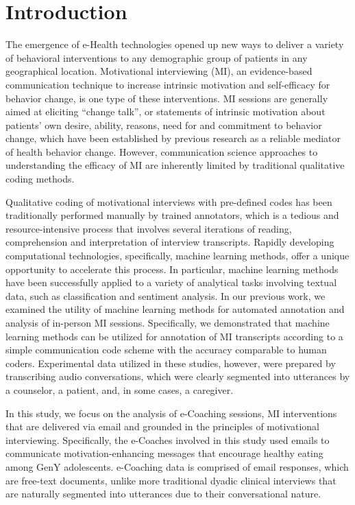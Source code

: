 \documentclass{amia}
\begin{document}
\section*{Introduction}
The emergence of e-Health technologies opened up new ways to deliver a variety of behavioral interventions to any demographic group of patients in any geographical location. Motivational interviewing (MI), an evidence-based communication technique to increase intrinsic motivation and self-efficacy for behavior change\cite{miller2012motivational,miller2009ten,miller2009toward}, is one type of these interventions. MI sessions are generally aimed at eliciting ``change talk'', or statements of intrinsic motivation about patients' own desire, ability, reasons, need for and commitment to behavior change, which have been established by previous research\cite{apodaca2009mechanisms} as a reliable mediator of health behavior change. However, communication science approaches to understanding the efficacy of MI are inherently limited by traditional qualitative coding methods. 

Qualitative coding of motivational interviews with pre-defined codes has been traditionally performed manually by trained annotators, which is a tedious and resource-intensive process that involves several iterations of reading, comprehension and interpretation of interview transcripts. Rapidly developing computational technologies, specifically, machine learning methods, offer a unique opportunity to accelerate this process. In particular, machine learning methods have been successfully applied to a variety of analytical tasks involving textual data, such as classification\cite{nigam2000text} and sentiment analysis\cite{wang2012baselines}. In our previous work, we examined the utility of machine learning methods for automated annotation \cite{hasan2016study,kotov2015interpretable} and analysis \cite{hasan2018predicting} of in-person MI sessions. Specifically, we demonstrated that machine learning methods can be utilized for annotation of MI transcripts according to a simple communication code scheme with the accuracy comparable to human coders\cite{hasan2016study}. Experimental data utilized in these studies, however, were prepared by transcribing audio conversations, which were clearly segmented into utterances by a counselor, a patient, and, in some cases, a caregiver. 

In this study, we focus on the analysis of e-Coaching sessions, MI interventions that are delivered via email and grounded in the principles of motivational interviewing. Specifically, the e-Coaches involved in this study used emails to communicate motivation-enhancing messages that encourage healthy eating among GenY adolescents. e-Coaching data is comprised of email responses, which are free-text documents, unlike more traditional dyadic clinical interviews that are naturally segmented into utterances due to their conversational nature.
\end{document}
